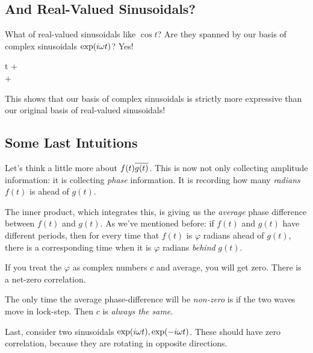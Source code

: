\subsection{And Real-Valued Sinusoidals?}

What of real-valued sinusoidals like $\cos t$? Are they spanned by our
basis of complex sinusoidals $\exp\mathopen{}\left( {i\omega t} \right)\mathclose{}$? Yes!

\begin{nedqn}
  \cos t
\eqcol
  \half {}
  +
  \half {}
\\\eqcol
  \half
  +
  \half
\\\eqcol
\end{nedqn}

This shows that our basis of complex sinusoidals is strictly more
expressive than our original basis of real-valued sinusoidals!

\subsection{Some Last Intuitions}

Let's think a little more about $f(t)\overline{g(t)}$. This is now not only
collecting amplitude information: it is collecting \emph{phase}
information. It is recording how many \emph{radians} $f(t)$ is ahead of
$g(t)$.

The inner product, which integrates this, is giving us the
\emph{average} phase difference between $f(t)$ and $g(t)$. As we've
mentioned before: if $f(t)$ and $g(t)$ have different periods, then for
every time that $f(t)$ is $\varphi$ radians ahead of $g(t)$, there is a
corresponding time when it is $\varphi$ radians \emph{behind} $g(t)$.

If you treat the $\varphi$ as complex numbers $c$ and average, you will
get zero. There is a net-zero correlation.

The only time the average phase-difference will be \emph{non-zero} is if
the two waves move in lock-step. Then $c$ is \emph{always the same}.

Last, consider two sinusoidals $\exp\mathopen{}\left( {i\omega t} \right)\mathclose{}, \exp\mathopen{}\left( {-i\omega t} \right)\mathclose{}$.
These should have zero correlation, because they are rotating in
opposite directions.
